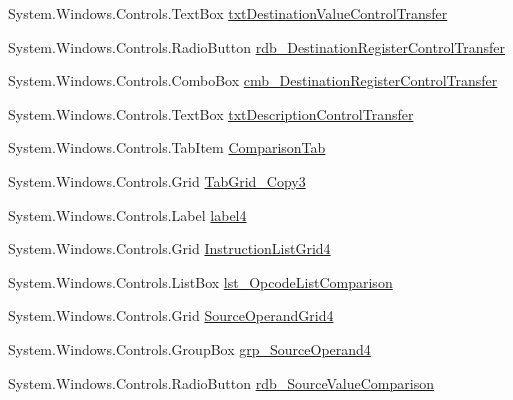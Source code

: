 \begin{DoxyCompactItemize}
\item 
System.\+Windows.\+Controls.\+Text\+Box \hyperlink{class_c_p_u___o_s___simulator_1_1_instructions_window_a0049dce789d892e6620158859bcf7057}{txt\+Destination\+Value\+Control\+Transfer}
\item 
System.\+Windows.\+Controls.\+Radio\+Button \hyperlink{class_c_p_u___o_s___simulator_1_1_instructions_window_a4911636b6e093aa89155a0f5db4b3118}{rdb\+\_\+\+Destination\+Register\+Control\+Transfer}
\item 
System.\+Windows.\+Controls.\+Combo\+Box \hyperlink{class_c_p_u___o_s___simulator_1_1_instructions_window_a9017d3508e5dde75eafec25e94611c97}{cmb\+\_\+\+Destination\+Register\+Control\+Transfer}
\item 
System.\+Windows.\+Controls.\+Text\+Box \hyperlink{class_c_p_u___o_s___simulator_1_1_instructions_window_af8667a9cb444eb6aaa84349fe194b853}{txt\+Description\+Control\+Transfer}
\item 
System.\+Windows.\+Controls.\+Tab\+Item \hyperlink{class_c_p_u___o_s___simulator_1_1_instructions_window_ab807abcf9c3955ae2ff78e1d667820b2}{Comparison\+Tab}
\item 
System.\+Windows.\+Controls.\+Grid \hyperlink{class_c_p_u___o_s___simulator_1_1_instructions_window_a8a50487f6e6acca8a58ffe218e32abe2}{Tab\+Grid\+\_\+\+Copy3}
\item 
System.\+Windows.\+Controls.\+Label \hyperlink{class_c_p_u___o_s___simulator_1_1_instructions_window_a6d028c99fa713c891d86c07ef46f083b}{label4}
\item 
System.\+Windows.\+Controls.\+Grid \hyperlink{class_c_p_u___o_s___simulator_1_1_instructions_window_a9cdd58a2e38d3f0b047b6eb64b43ea03}{Instruction\+List\+Grid4}
\item 
System.\+Windows.\+Controls.\+List\+Box \hyperlink{class_c_p_u___o_s___simulator_1_1_instructions_window_ae47949fa5657e55f8acd8e5b9cd204c0}{lst\+\_\+\+Opcode\+List\+Comparison}
\item 
System.\+Windows.\+Controls.\+Grid \hyperlink{class_c_p_u___o_s___simulator_1_1_instructions_window_ac28180235c174caa7a2870120a9258bb}{Source\+Operand\+Grid4}
\item 
System.\+Windows.\+Controls.\+Group\+Box \hyperlink{class_c_p_u___o_s___simulator_1_1_instructions_window_a0efec3cdad460e3596a699716e0a24e9}{grp\+\_\+\+Source\+Operand4}
\item 
System.\+Windows.\+Controls.\+Radio\+Button \hyperlink{class_c_p_u___o_s___simulator_1_1_instructions_window_a6232aa7952b3d4ea71c55eb14267f188}{rdb\+\_\+\+Source\+Value\+Comparison}

\end{DoxyCompactItemize}
